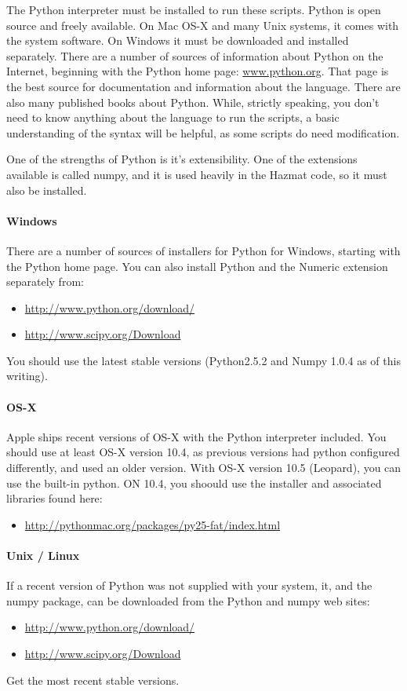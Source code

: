 \documentclass[12pt]{article}      %
\begin{document}
The Python interpreter must be installed to run these scripts. Python is
open source and freely available. On Mac OS-X and many Unix systems, it
comes with the system software. On Windows it must be downloaded and
installed separately. There are a number of sources of information about
Python on the Internet, beginning with the Python home page:
\url{www.python.org}. That page is the best source for documentation and
information about the language. There are also many published books
about Python. While, strictly speaking, you don't need to know anything
about the language to run the scripts, a basic understanding of the
syntax will be helpful, as some scripts do need modification.

One of the strengths of Python is it's extensibility. One of the
extensions available is called numpy, and it is used heavily in
the Hazmat code, so it must also be installed.

\paragraph{Windows}
There are a number of sources of installers for Python for Windows,
starting with the Python home page. You can also install Python and
the Numeric extension separately from:
\begin{itemize}
\item \url{http://www.python.org/download/}
\item \url{http://www.scipy.org/Download}
\end{itemize}
You should use the latest stable versions (Python2.5.2 and
Numpy 1.0.4 as of this writing).

\paragraph{OS-X}

Apple ships recent versions of OS-X with the Python interpreter
included. You should use at least OS-X version 10.4, as previous
versions had python configured differently, and used an older version. With OS-X version 10.5 (Leopard), you can use the built-in python. ON 10.4, you shoould use the installer and associated libraries found here:

\begin{itemize}
  \item \url{http://pythonmac.org/packages/py25-fat/index.html}
\end{itemize}

\paragraph{Unix / Linux}
If a recent version of Python was not supplied with your system, it, and
the numpy package, can be downloaded from the Python and numpy web sites:
\begin{itemize}
  \item \url{http://www.python.org/download/}
  \item \url{http://www.scipy.org/Download}
\end{itemize}
Get the most recent stable versions.
\end{document}
